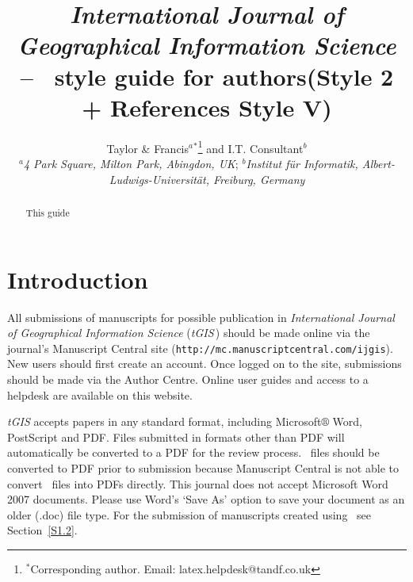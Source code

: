 \documentclass[]{tGIS2e}
\begin{document}



\title{{\itshape International Journal of Geographical Information Science} -- \LaTeXe\ style guide
for authors\newline (Style 2 + References Style V)}

\author{Taylor \& Francis$^{a}$$^{\ast}$\thanks{$^\ast$Corresponding author. Email: latex.helpdesk@tandf.co.uk
\vspace{6pt}} and I.T. Consultant$^{b}$\\\vspace{6pt}  $^{a}${\em{4 Park Square, Milton Park, Abingdon, UK}};
$^{b}${\em{Institut f\"{u}r Informatik, Albert-Ludwigs-Universit\"{a}t, Freiburg,
Germany}}\\\vspace{6pt} }

\maketitle

\begin{abstract}
This guide 
\end{abstract}


\section{Introduction}

All submissions of manuscripts for possible publication in {\itshape International Journal of Geographical Information Science} ({\it tGIS}\,)  should be made online via the journal's Manuscript Central site ({\tt{http://mc.manuscriptcentral.com/ijgis}}). New users should first create an account. Once logged on to the site, submissions should be made via the Author Centre. Online user guides and access to a helpdesk are available on this website.

{\it tGIS} accepts papers in any standard format, including Microsoft$\circledR$ Word, PostScript and PDF. Files submitted in formats other than PDF will automatically be converted to a PDF for the review process. \LaTeXe\ files should be converted to PDF prior to submission because Manuscript Central is not able to convert \LaTeXe\ files into PDFs directly. This journal does not accept Microsoft Word 2007 documents. Please use Word's `Save As' option to save your document as an older (.doc) file type. For the submission of manuscripts created using \LaTeXe\, see Section~\ref{S1.2}.
\end{document}
